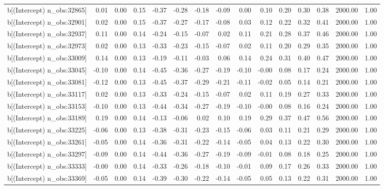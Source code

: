 \begin{table}[ht]
\begin{tabular}{rrrrrrrrrrrrrrr}
  b[(Intercept) n\_obs:32865] & 0.01 & 0.00 & 0.15 & -0.37 & -0.28 & -0.18 & -0.09 & 0.00 & 0.10 & 0.20 & 0.30 & 0.38 & 2000.00 & 1.00 \\ 
  b[(Intercept) n\_obs:32901] & 0.02 & 0.00 & 0.15 & -0.37 & -0.27 & -0.17 & -0.08 & 0.03 & 0.12 & 0.22 & 0.32 & 0.41 & 2000.00 & 1.00 \\ 
  b[(Intercept) n\_obs:32937] & 0.11 & 0.00 & 0.14 & -0.24 & -0.15 & -0.07 & 0.02 & 0.11 & 0.21 & 0.28 & 0.37 & 0.46 & 2000.00 & 1.00 \\ 
  b[(Intercept) n\_obs:32973] & 0.02 & 0.00 & 0.13 & -0.33 & -0.23 & -0.15 & -0.07 & 0.02 & 0.11 & 0.20 & 0.29 & 0.35 & 2000.00 & 1.00 \\ 
  b[(Intercept) n\_obs:33009] & 0.14 & 0.00 & 0.13 & -0.19 & -0.11 & -0.03 & 0.06 & 0.14 & 0.24 & 0.31 & 0.40 & 0.47 & 2000.00 & 1.00 \\ 
  b[(Intercept) n\_obs:33045] & -0.10 & 0.00 & 0.14 & -0.45 & -0.36 & -0.27 & -0.19 & -0.10 & -0.00 & 0.08 & 0.17 & 0.24 & 2000.00 & 1.00 \\ 
  b[(Intercept) n\_obs:33081] & -0.12 & 0.00 & 0.13 & -0.45 & -0.37 & -0.29 & -0.21 & -0.11 & -0.02 & 0.05 & 0.14 & 0.21 & 2000.00 & 1.00 \\ 
  b[(Intercept) n\_obs:33117] & 0.02 & 0.00 & 0.13 & -0.33 & -0.24 & -0.15 & -0.07 & 0.02 & 0.11 & 0.19 & 0.27 & 0.33 & 2000.00 & 1.00 \\ 
  b[(Intercept) n\_obs:33153] & -0.10 & 0.00 & 0.13 & -0.44 & -0.34 & -0.27 & -0.19 & -0.10 & -0.00 & 0.08 & 0.16 & 0.24 & 2000.00 & 1.00 \\ 
  b[(Intercept) n\_obs:33189] & 0.19 & 0.00 & 0.14 & -0.13 & -0.06 & 0.02 & 0.10 & 0.19 & 0.29 & 0.37 & 0.47 & 0.56 & 2000.00 & 1.00 \\ 
  b[(Intercept) n\_obs:33225] & -0.06 & 0.00 & 0.13 & -0.38 & -0.31 & -0.23 & -0.15 & -0.06 & 0.03 & 0.11 & 0.21 & 0.29 & 2000.00 & 1.00 \\ 
  b[(Intercept) n\_obs:33261] & -0.05 & 0.00 & 0.14 & -0.36 & -0.31 & -0.22 & -0.14 & -0.05 & 0.04 & 0.13 & 0.22 & 0.30 & 2000.00 & 1.00 \\ 
  b[(Intercept) n\_obs:33297] & -0.09 & 0.00 & 0.14 & -0.44 & -0.36 & -0.27 & -0.19 & -0.09 & -0.01 & 0.08 & 0.18 & 0.25 & 2000.00 & 1.00 \\ 
  b[(Intercept) n\_obs:33333] & -0.00 & 0.00 & 0.14 & -0.33 & -0.26 & -0.18 & -0.10 & -0.01 & 0.09 & 0.17 & 0.26 & 0.33 & 2000.00 & 1.00 \\ 
  b[(Intercept) n\_obs:33369] & -0.05 & 0.00 & 0.14 & -0.39 & -0.30 & -0.22 & -0.14 & -0.05 & 0.05 & 0.13 & 0.22 & 0.31 & 2000.00 & 1.00 \\ 

\end{tabular}
\end{table}
